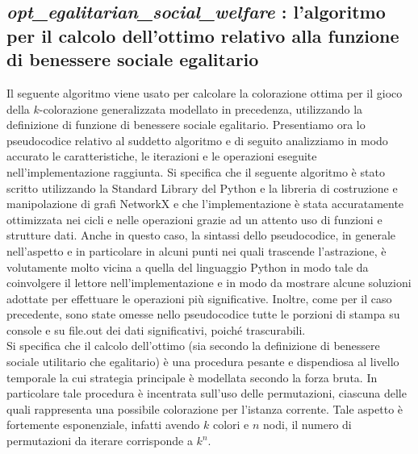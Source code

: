 \newpage
\subsection{\textit{opt\_egalitarian\_social\_welfare} : l'algoritmo per il calcolo dell'ottimo relativo alla funzione di benessere sociale egalitario}
\justify
Il seguente algoritmo viene usato per calcolare la colorazione ottima per il gioco della \(k\)-colorazione generalizzata modellato in precedenza, utilizzando la definizione di funzione di benessere sociale egalitario. Presentiamo ora lo pseudocodice relativo al suddetto algoritmo e di seguito analizziamo in modo accurato le caratteristiche, le iterazioni e le operazioni eseguite nell'implementazione raggiunta. Si specifica che il seguente algoritmo è stato scritto utilizzando la Standard Library del Python e la libreria di costruzione e manipolazione di grafi NetworkX e che l'implementazione è stata accuratamente ottimizzata nei cicli e nelle operazioni grazie ad un attento uso di funzioni e strutture dati. Anche in questo caso, la sintassi dello pseudocodice, in generale nell'aspetto e in particolare in alcuni punti nei quali trascende l'astrazione, è volutamente molto vicina a quella del linguaggio Python in modo tale da coinvolgere il lettore nell'implementazione e in modo da mostrare alcune soluzioni adottate per effettuare le operazioni più significative. Inoltre, come per il caso precedente, sono state omesse nello pseudocodice tutte le porzioni di stampa su console e su file.out dei dati significativi, poiché trascurabili.\\
Si specifica che il calcolo dell'ottimo (sia secondo la definizione di benessere sociale utilitario che egalitario) è una procedura pesante e dispendiosa al livello temporale la cui strategia principale è modellata secondo la forza bruta. In particolare tale procedura è incentrata sull'uso delle permutazioni, ciascuna delle quali rappresenta una possibile colorazione per l'istanza corrente. Tale aspetto è fortemente esponenziale, infatti avendo \(k\) colori e \(n\) nodi, il numero di permutazioni da iterare corrisponde a \(k^n\).

